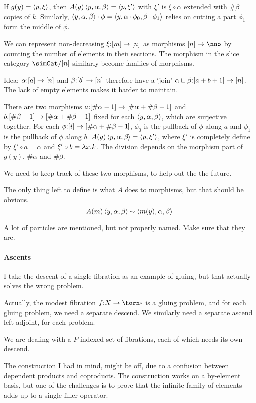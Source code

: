 \documentclass[csh.tex]{subfiles}
\begin{document}
If $g(y) = \left\langle p,\xi \right\rangle$, then $A(g)\left\langle y,\alpha,\beta \right\rangle = \left\langle p,\xi' \right\rangle$ with $\xi'$ is $\xi\circ\alpha$ extended with $\#\beta$ copies of $k$. 
Similarly, $\left\langle y,\alpha,\beta \right\rangle\cdot\phi = \left\langle y,\alpha\cdot\phi_0,\beta\cdot\phi_1 \right\rangle$ relies on cutting a part $\phi_1$ form the middle of $\phi$.

We can represent non-decreasing $\xi\mathord :[m]\to [n]$ as morphisms $[n]\to \nno$ by counting the number of elements in their sections. The morphism in the slice category $\simCat/[n]$ similarly become families of morphisms.

Idea: $\alpha\mathord :[a]\to[n]$ and $\beta\mathord :[b]\to[n]$ therefore have a `join' $\alpha\sqcup\beta\mathord :[a + b + 1]\to[n]$. The lack of empty elements makes it harder to maintain.

There are two morphisms $a\mathord : [\#\alpha - 1]\to[\#\alpha + \#\beta - 1]$ and $b\mathord :[\#\beta - 1]\to[\#\alpha + \#\beta - 1]$ fixed for each $\left\langle y,\alpha,\beta \right\rangle$, which are surjective together. For each $\phi\mathord : [i] \to [\#\alpha + \#\beta - 1]$, $\phi_0$ is the pullback of $\phi$ along $a$ and $\phi_1$ is the pullback of $\phi$ along $b$. $A(g)\left\langle y,\alpha,\beta \right\rangle = \left\langle p,\xi' \right\rangle$, where $\xi'$ is completely define by $\xi'\circ a = \alpha$ and $\xi'\circ b = \lambda x .k$. The division depends on the morphism part of $g(y)$, $\#\alpha$ and $\#\beta$.

We need to keep track of these two morphisms, to help out the the future.

The only thing left to define is what $A$ does to morphisms, but that should be obvious.
\[ A(m)\left\langle y,\alpha,\beta \right\rangle\sim \left\langle m(y),\alpha,\beta \right\rangle \]

A lot of particles are mentioned, but not properly named. Make sure that they are.

\paragraph{Ascents}
I take the descent of a single fibration as an example of gluing, but that actually solves the wrong problem.

Actually, the modest fibration $f\of X \to \horn_?$ is a gluing problem, and for each gluing problem, we need a separate descend. We similarly need a separate ascend left adjoint, for each problem.

We are dealing with a $P$ indexed set of fibrations, each of which needs its own descend.

The construction I had in mind, might be off, due to a confusion between dependent products and coproducts. The construction works on a by-element basis, but one of the challenges is to prove that the infinite family of elements adds up to a single filler operator.
\end{document}
